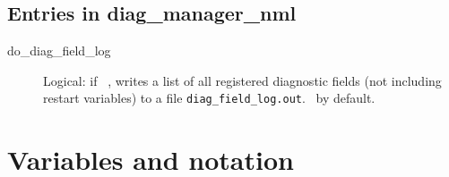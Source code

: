 \documentclass[12pt,letterpaper]{book}
\begin{document}
\section{{Entries in diag\_manager\_nml} }

\begin{description}

\item[do\_diag_field_log] Logical: if \true\ , writes a list of all registered diagnostic fields (not including restart variables) to a file \texttt{diag_field_log.out}. \false\ by default.

\end{description}

\chapter{Variables and notation}
\end{document}
